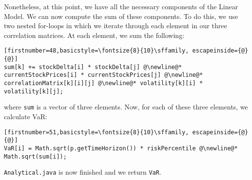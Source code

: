 \documentclass[../Dissertation.tex]{subfiles}
\begin{document}
Nonetheless, at this point, we have all the necessary components of the Linear Model.
We can now compute the sum of these components.
To do this, we use two nested for-loops in which we iterate through each element in our three correlation matrices.
At each element, we sum the following:
\begin{lstlisting}[firstnumber=48,basicstyle=\fontsize{8}{10}\sffamily, escapeinside={@}{@}]
sum[k] += stockDelta[i] * stockDelta[j] @\newline@* currentStockPrices[i] * currentStockPrices[j] @\newline@* correlationMatrix[k][i][j] @\newline@* volatility[k][i] * volatility[k][j];
\end{lstlisting}
where \lstinline|sum| is a vector of three elements. Now, for each of these three elements, we calculate VaR:
\begin{lstlisting}[firstnumber=51,basicstyle=\fontsize{8}{10}\sffamily, escapeinside={@}{@}]
VaR[i] = Math.sqrt(p.getTimeHorizon()) * riskPercentile @\newline@* Math.sqrt(sum[i]);
\end{lstlisting}
\lstinline|Analytical.java| is now finished and we return \lstinline|VaR|.
\fi
\end{document}
